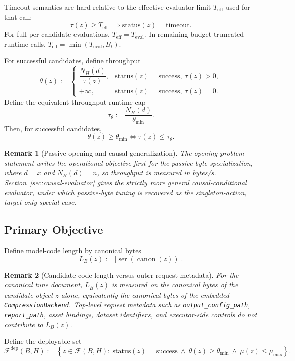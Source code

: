 \documentclass[11pt]{article}
\newtheorem{remark}{Remark}
\begin{document}
Timeout semantics are hard relative to the effective evaluator limit
$T_{\mathrm{eff}}$ used for that call:
\[
\tau(z) \ge T_{\mathrm{eff}} \implies \mathrm{status}(z)=\mathrm{timeout}.
\]
For full per-candidate evaluations,
$T_{\mathrm{eff}}=T_{\mathrm{eval}}$. In remaining-budget-truncated runtime
calls, $T_{\mathrm{eff}}=\min(T_{\mathrm{eval}},B_t)$.

For successful candidates, define throughput
\[
\theta(z):=
\begin{cases}
\dfrac{N_H(d)}{\tau(z)}, & \mathrm{status}(z)=\mathrm{success},\ \tau(z)>0,\\[4pt]
+\infty, & \mathrm{status}(z)=\mathrm{success},\ \tau(z)=0.
\end{cases}
\]
Define the equivalent throughput runtime cap
\[
\tau_{\theta}:=\frac{N_H(d)}{\theta_{\min}}.
\]
Then, for successful candidates,
\[
\theta(z)\ge\theta_{\min}
\iff
\tau(z)\le\tau_{\theta}.
\]

\begin{remark}[Passive opening and causal generalization]
The opening problem statement writes the operational objective first for the
passive-byte specialization, where $d=x$ and $N_H(d)=n$, so throughput is
measured in bytes/s. Section~\ref{sec:causal-evaluator} gives the strictly more
general causal-conditional evaluator, under which passive-byte tuning is
recovered as the singleton-action, target-only special case.
\end{remark}

\subsection{Primary Objective}

Define model-code length by canonical bytes
\[
L_B(z):=\big|\operatorname{ser}(\operatorname{canon}(z))\big|.
\]

\begin{remark}[Candidate code length versus outer request metadata]
For the canonical tune document, $L_B(z)$ is measured on the canonical bytes
of the candidate object $z$ alone, equivalently the canonical bytes of the
embedded \texttt{CompressionBackend}. Top-level request metadata such as
\texttt{output\_config\_path}, \texttt{report\_path}, asset bindings, dataset
identifiers, and executor-side controls do not contribute to $L_B(z)$.
\end{remark}

Define the deployable set
\[
\mathcal{F}^{\mathrm{dep}}(B,H):=
\left\{z\in\mathcal{F}(B,H):\ \mathrm{status}(z)=\mathrm{success}\ \land\ \theta(z)\ge\theta_{\min}\ \land\ \mu(z)\le\mu_{\max}\right\}.
\]
\end{document}
